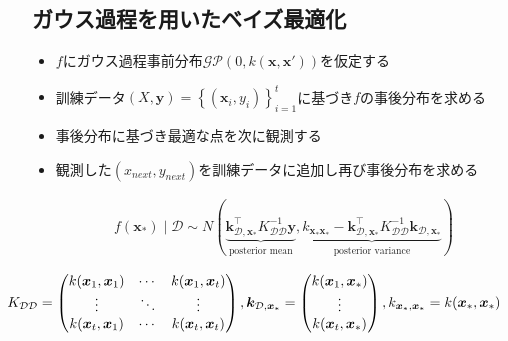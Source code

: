 \documentclass[dvipdfmx, 10.5pt]{beamer}
\begin{document}
\subsection{ガウス過程を用いたベイズ最適化}
\begin{frame}{\insertsubsection}
	\begin{itemize}
		\item $f$にガウス過程事前分布$\mathcal{GP}(0, k(\bm x, \bm x'))$を仮定する
		\item 訓練データ$(X, \bm y) = \left\{ (\bm x_i, y_i) \right\}_{i=1}^t$に基づき$f$の事後分布を求める
		\item 事後分布に基づき\alert{最適な点}を次に観測する
		\item 観測した$(x_{next}, y_{next})$を訓練データに追加し再び事後分布を求める
	\end{itemize}
	\begin{align*}
		f({\bm x}_\ast) \mid \mathcal{D}
		 \sim
		 N \left(
		 \underbrace{
		 \bm k_{\mathcal{D}, {\bm x}_\ast   }^\top
		 K_{\mathcal{D} \mathcal{D}}^{-1}
		 {\bm y}}_{\text{posterior mean}},
		 \underbrace{
		 k_{{\bm x}_\ast {\bm x}_\ast}
		 -
		 \bm k_{\mathcal{D} , {\bm x}_\ast}^\top
		 K_{\mathcal{D} \mathcal{D}}^{-1}
		 \bm k_{\mathcal{D} , {\bm x}_\ast}}_{\text{posterior variance}}
		 \right)
		\end{align*}

		\begin{tiny}
			\begin{align*}
			 \hspace*{-15mm}
			 K_{\mathcal{D} \mathcal{D}}
			 =
		\begin{pmatrix}
			 k(\bm x_{ 1}, \bm x_{ 1}) &
			 \cdots &
			 k(\bm x_{ 1}, \bm x_{ t}) \\
			 \vdots &
			 \ddots &
			 \vdots \\ 	 
			 k(\bm x_{ t}, \bm x_{ 1}) &
			 \cdots &
			 k(\bm x_{ t}, \bm x_{t}) 
		\end{pmatrix},
			 \bm k_{\mathcal{D} ,{\bm x}_\ast}
			 =
		\begin{pmatrix}
			 k(\bm x_{ 1}, \bm x_\ast) \\
			 \vdots \\
			 k(\bm x_{ t}, \bm x_\ast) 
		\end{pmatrix},
			 k_{{\bm x}_\ast, {\bm x}_\ast}
			 =
			 k(\bm x_{\ast}, \bm x_{\ast})
			\end{align*}
			\end{tiny}

\end{frame}
\end{document}
